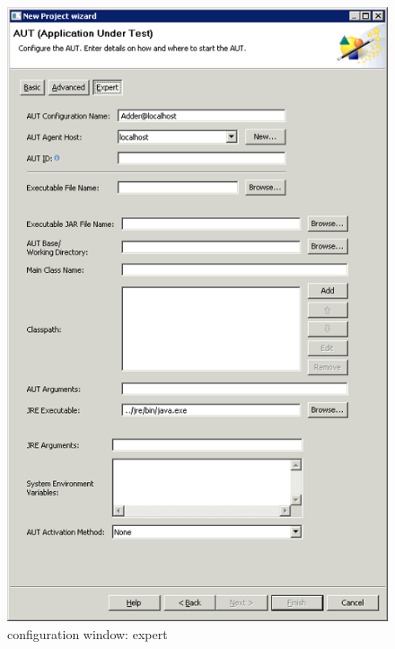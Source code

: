 \begin{figure}[h]
\begin{center}
\includegraphics{Tasks/AUTs/PS/autconfigwindow_expert}
\caption{\gdaut configuration window: expert}
\label{autconfigexpert}
\end{center}
\end{figure}

